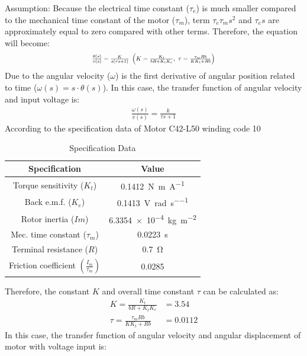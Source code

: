 \documentclass[conference]{IEEEtran}
\begin{document}
Assumption: Because the electrical time constant ($\tau_e$) is much smaller compared to the mechanical time constant of the motor ($\tau_m$), term $\tau_e\tau_ms^2$ and $\tau_es$ are approximately equal to zero compared with other terms. Therefore, the equation will become:
\begin{align}
    \resizebox{.43 \textwidth}{!}
    {$
    \frac{\theta (s)}{v(s)} = \frac{K}{s(\tau s + 1)} \ \left( K = \frac{K_t}{bR + K_t K_e}, \ \tau = \frac{\tau_m Rb}{K K_t + Rb} \right)
    $}
\end{align}
Due to the angular velocity ($\omega$) is the first derivative of angular position related to time ($\omega\left(s\right)=s\cdot\theta\left(s\right)$). In this case, the transfer function of angular velocity and input voltage is:
\begin{align}
    \frac{\omega(s)}{v(s)} = \frac{k}{\tau s + 1}
\end{align}
According to the specification data of Motor C42-L50 winding code 10 
\begin{table}[htbp]
    \caption{Specification Data}
    \begin{center}
    \begin{tabular}{|c|c|}
    \hline
    \textbf{Specification} & \textbf{Value}\\
    \hline
    \hline
    Torque sensitivity ($K_t$) & \SI{0.1412}{\newton\metre\per\ampere}\\
    \hline
    Back e.m.f. ($K_e$) & \SI{0.1413}{\volt\per\radian\per\second}\\
    \hline
    Rotor inertia ($Im$) & \SI{6.3354e-4}{\kg\per\meter\squared}\\
    \hline
    Mec. time constant ($\tau_m$) & \SI{0.0223}{\second}\\
    \hline
    Terminal resistance ($R$) & \SI{0.7}{\ohm}\\
    \hline
    Friction coefficient $\left(\frac{I_m}{\tau_m}\right)$ & \SI{0.0285}{}\\
    \hline
    \end{tabular}
    \label{sdtable}
    \end{center}
\end{table}
Therefore, the constant $K$ and overall time constant $\tau$ can be calculated as:
\begin{align}
    K = \frac{K_t}{bR + K_t K_e} &= 3.54\\ 
    \tau = \frac{\tau_m Rb}{K K_t + Rb} &= 0.0112
\end{align}
In this case, the transfer function of angular velocity and angular displacement of motor with voltage input is:
\end{document}

